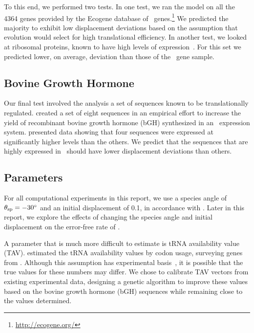 \documentclass[12pt]{article}
\begin{document}
To this end, we performed two tests. In one test, we ran the model on
all the 4364 genes provided by the Ecogene database of
\ecoli\ genes.\footnote{\url{http://ecogene.org/}}
We predicted the majority to exhibit low
displacement deviations based on the assumption that evolution would select
for high translational efficiency. In another
test, we looked at ribosomal proteins, known to have high levels of
expression~\cite{rpoS:process}. For this set we predicted lower, on average,
deviation than those of the \ecoli\ gene sample.
	
\subsection{Bovine Growth Hormone}
Our final test involved the analysis a set of sequences known to 
be translationally regulated.  \citet{schoner:bgh} created a set 
of eight sequences in an empirical effort to increase the yield 
of recombinant bovine growth hormone (bGH) synthesized in an 
\ecoli\ expression system. \citeauthor{schoner:bgh} 
presented data showing that 
four sequences were expressed 
at significantly higher levels than the others. We predict that 
the sequences that are highly expressed in \ecoli\ should have 
lower displacement deviations than others.

\subsection{Parameters}
\label{section:parameters}
For all computational experiments in this report, we use a species
angle of $\theta_{\rm{sp}} = -30^\circ$ and an initial displacement of 0.1,
in accordance with \citet{lalit:mechanics}.
Later in this report, we explore
the effects of changing the species angle and initial displacement on the
error-free rate of \prfB.

A parameter that is much more difficult to estimate
is tRNA availability value (TAV).
\citeauthor{lalit:mechanics} estimated the tRNA availability values by codon usage, 
surveying genes from \ecoli.
Although this assumption has experimental basis~\cite{ikemura}, 
it is possible that the true values for these numbers may differ.
We chose to calibrate TAV vectors from existing experimental data, 
designing a genetic algorithm to improve these values based on 
the bovine growth hormone (bGH) sequences while remaining close 
to the values \citeauthor{lalit:mechanics} determined.
\end{document}
